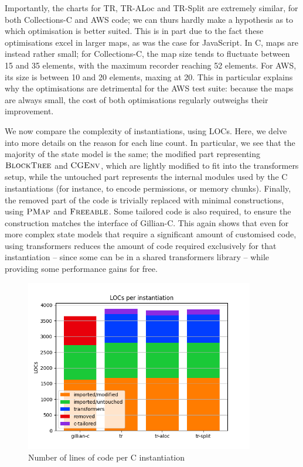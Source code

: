 Importantly, the charts for TR, TR-ALoc and TR-Split are extremely similar, for both Collections-C and AWS code; we can thurs hardly make a hypothesis as to which optimisation is better suited. This is in part due to the fact these optimisations excel in larger maps, as was the case for JavaScript. In C, maps are instead rather small; for Collections-C, the map size tends to fluctuate between 15 and 35 elements, with the maximum recorder reaching 52 elements. For AWS, its size is between 10 and 20 elements, maxing at 20. This in particular explains why the optimisations are detrimental for the AWS test suite: because the maps are always small, the cost of both optimisations regularly outweighs their improvement.

We now compare the complexity of instantiations, using LOCs. Here, we delve into more details on the reason for each line count. In particular, we see that the majority of the state model is the same; the modified part representing $\textsc{BlockTree}$ and $\textsc{CGEnv}$, which are lightly modified to fit into the transformers setup, while the untouched part represents the internal modules used by the C instantiations (for instance, to encode permissions, or memory chunks). Finally, the removed part of the code is trivially replaced with minimal constructions, using $\textsc{PMap}$ and $\textsc{Freeable}$. Some tailored code is also required, to ensure the construction matches the interface of Gillian-C. This again shows that even for more complex state models that require a significant amount of customised code, using transformers reduces the amount of code required exclusively for that instantiation -- since some can be in a shared transformers library -- while providing some performance gains for free.

\begin{figure}
	\centering
	\includegraphics[width=10cm]{figures/c-loc-count.png}
	\caption{Number of lines of code per C instantiation}
	\label{fig:c-loc-count}
\end{figure}









